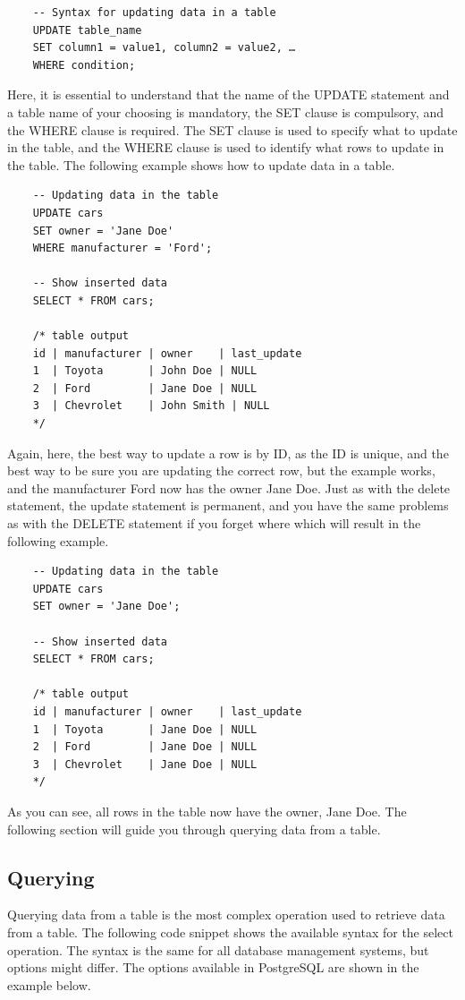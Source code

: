 \begin{verbatim}
    -- Syntax for updating data in a table
    UPDATE table_name
    SET column1 = value1, column2 = value2, …
    WHERE condition;
\end{verbatim}

Here, it is essential to understand that the name of the UPDATE statement and a table name of your choosing is mandatory, the SET clause is compulsory, and the WHERE clause is required. The SET clause is used to specify what to update in the table, and the WHERE clause is used to identify what rows to update in the table. The following example shows how to update data in a table.

\begin{verbatim}
    -- Updating data in the table
    UPDATE cars
    SET owner = 'Jane Doe'
    WHERE manufacturer = 'Ford';

    -- Show inserted data
    SELECT * FROM cars;

    /* table output
    id | manufacturer | owner    | last_update
    1  | Toyota       | John Doe | NULL
    2  | Ford         | Jane Doe | NULL
    3  | Chevrolet    | John Smith | NULL
    */
\end{verbatim}

Again, here, the best way to update a row is by ID, as the ID is unique, and the best way to be sure you are updating the correct row, but the example works, and the manufacturer Ford now has the owner Jane Doe. Just as with the delete statement, the update statement is permanent, and you have the same problems as with the DELETE statement if you forget where which will result in the following example.

\begin{verbatim}
    -- Updating data in the table
    UPDATE cars
    SET owner = 'Jane Doe';

    -- Show inserted data
    SELECT * FROM cars;

    /* table output
    id | manufacturer | owner    | last_update
    1  | Toyota       | Jane Doe | NULL
    2  | Ford         | Jane Doe | NULL
    3  | Chevrolet    | Jane Doe | NULL
    */
\end{verbatim}

As you can see, all rows in the table now have the owner, Jane Doe. The following section will guide you through querying data from a table.

\subsection{Querying}
Querying data from a table is the most complex operation used to retrieve data from a table. The following code snippet shows the available syntax for the select operation. The syntax is the same for all database management systems, but options might differ. The options available in PostgreSQL are shown in the example below.

